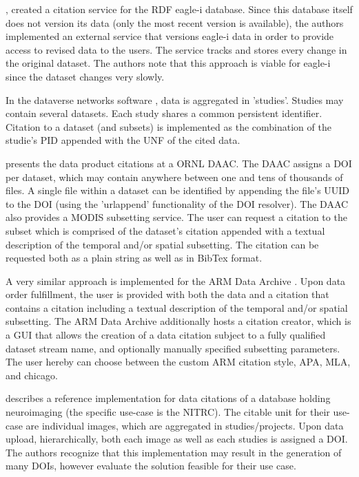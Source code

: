 \documentclass[letterpaper, parskip=half]{scrartcl}
\begin{document}
\cite{Alawini2017}, created a citation service for the \gls{RDF} eagle-i database. Since this database itself does not version its data (only the most recent version is available), the authors implemented an external service that versions eagle-i data in order to provide access to revised data to the users. The service tracks and stores every change in the original dataset.  The authors note that this approach is viable for eagle-i since the dataset changes very slowly.

In the dataverse networks software \citep{Crosas2011}, data is aggregated in 'studies'. Studies may contain several datasets. Each study shares a common persistent identifier. Citation to a dataset (and subsets) is implemented as the combination of the studie's \gls{PID} appended with the UNF of the cited data.

\cite{Cook2016} presents the data product citations at a \gls{ORNL} \gls{DAAC}. The DAAC assigns a \gls{DOI} per dataset, which may contain anywhere between one and tens of thousands of files. A single file within a dataset can be identified by appending the file's UUID to the DOI (using the 'urlappend' functionality of the DOI resolver). The DAAC also provides a MODIS subsetting service. The user can request a citation to the subset which is comprised of the dataset's citation appended with a textual description of the temporal and/or spatial subsetting. The citation can be requested both as a plain string as well as in BibTex format.

A very similar approach is implemented for the \gls{ARM} Data Archive \citep{Prakash2016}. Upon data order fulfillment, the user is provided with both the data and a citation that contains a citation including a textual description of the temporal and/or spatial subsetting. The \gls{ARM} Data Archive additionally hosts a citation creator, which is a \gls{GUI} that allows the creation of a data citation subject to a fully qualified dataset stream name, and optionally manually specified subsetting parameters. The user hereby can choose between the custom ARM citation style, APA, MLA, and chicago.

\cite{Honor2016} describes a reference implementation for data citations of a database holding neuroimaging (the specific use-case is the \gls{NITRC}). The citable unit for their use-case are individual images, which are aggregated in studies/projects. Upon data upload, hierarchically, both each image as well as each studies is assigned a \gls{DOI}. The authors recognize that this implementation may result in the generation of many \glspl{DOI}, however evaluate the solution feasible for their use case.
\end{document}
